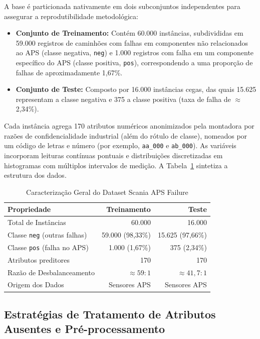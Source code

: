 \documentclass[conference]{IEEEtran}
\begin{document}
A base é particionada nativamente em dois subconjuntos independentes para assegurar a reprodutibilidade metodológica:
\begin{itemize}
    \item \textbf{Conjunto de Treinamento:} Contém 60.000 instâncias, subdivididas em 59.000 registros de caminhões com falhas em componentes não relacionados ao APS (classe negativa, \texttt{neg}) e 1.000 registros com falha em um componente específico do APS (classe positiva, \texttt{pos}), correspondendo a uma proporção de falhas de aproximadamente 1,67\%.
    \item \textbf{Conjunto de Teste:} Composto por 16.000 instâncias cegas, das quais 15.625 representam a classe negativa e 375 a classe positiva (taxa de falha de $\approx$ 2,34\%).
\end{itemize}

Cada instância agrega 170 atributos numéricos anonimizados pela montadora por razões de confidencialidade industrial (além do rótulo de classe), nomeados por um código de letras e número (por exemplo, \texttt{aa\_000} e \texttt{ab\_000}). As variáveis incorporam leituras contínuas pontuais e distribuições discretizadas em histogramas com múltiplos intervalos de medição. A Tabela~\ref{tab:caracterizacao_dados} sintetiza a estrutura dos dados.

\begin{table}[!t]
\caption{Caracterização Geral do Dataset Scania APS Failure}
\label{tab:caracterizacao_dados}
\centering
\footnotesize
\setlength{\tabcolsep}{5pt}
\begin{tabular}{lrr}
\toprule
\textbf{Propriedade} & \textbf{Treinamento} & \textbf{Teste} \\
\midrule
Total de Instâncias & 60.000 & 16.000 \\
Classe \texttt{neg} (outras falhas) & 59.000 (98,33\%) & 15.625 (97,66\%) \\
Classe \texttt{pos} (falha no APS) & 1.000 (1,67\%) & 375 (2,34\%) \\
Atributos preditores & 170 & 170 \\
Razão de Desbalanceamento & $\approx 59:1$ & $\approx 41{,}7:1$ \\
Origem dos Dados & Sensores APS & Sensores APS \\
\bottomrule
\end{tabular}
\end{table}

\subsection{Estratégias de Tratamento de Atributos Ausentes e Pré-processamento}
\end{document}
